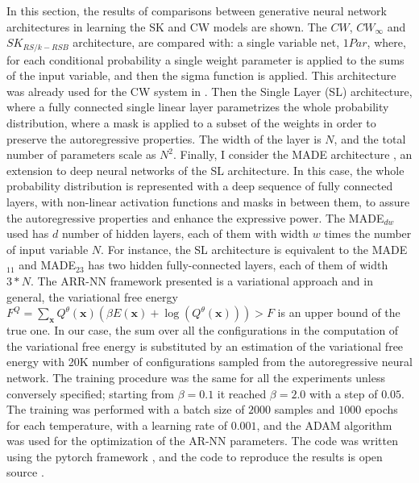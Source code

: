 \documentclass[aps,physrev,10pt,floatfix,reprint]{revtex4-2}
\begin{document}
In this section, the results of comparisons between generative neural network architectures in learning the SK and CW models are shown. 
The $CW$, $CW_{\infty}$ and $SK_{RS/k-RSB}$ architecture, are compared with: a single variable net, $1Par$, where, for each conditional probability a single weight parameter is applied to the sums of the input variable, and then the sigma function is applied. This architecture was already used for the CW system in \cite{https://doi.org/10.48550/arxiv.2210.11145}. Then the Single Layer (SL) architecture, where a fully connected single linear layer parametrizes the whole probability distribution, where a mask is applied to a subset of the weights in order to preserve the autoregressive properties. The width of the layer is $N$, and the total number of parameters scale as $N^2$. Finally, I consider the MADE architecture \cite{pmlr-v37-germain15}, an extension to deep neural networks of the SL architecture. In this case, the whole probability distribution is represented with a deep sequence of fully connected layers, with non-linear activation functions and masks in between them, to assure the autoregressive properties and enhance the expressive power. The MADE$_{dw}$ used has $d$ number of hidden layers, each of them with width $w$ times the number of input variable $N$. For instance, the SL architecture is equivalent to the MADE$_{11}$ and MADE$_{23}$ has two hidden fully-connected layers, each of them of width $3*N$. 
The ARR-NN framework presented is a variational approach and in general, the variational free energy $F^{Q} =  \sum_{\mathbf{x}} Q^{\theta}(\mathbf{x})(\beta E(\mathbf{x}) + \log(Q^{\theta}(\mathbf{x}))) > F$ is an upper bound of the true one. In our case, the sum over all the configurations in the computation of the variational free energy is substituted by an estimation of the variational free energy with 20K number of configurations sampled from the autoregressive neural network.
The training procedure was the same for all the experiments unless conversely specified; starting from $\beta=0.1$ it reached $\beta=2.0$ with a step of $0.05$. The training was performed with a batch size of $2000$ samples and $1000$ epochs for each temperature, with a learning rate of $0.001$, and the ADAM algorithm was used for the optimization of the AR-NN parameters. The code was written using the pytorch framework \cite{NEURIPS2019_bdbca288}, and the code to reproduce the results is open source \cite{mygithub}.
\end{document}
